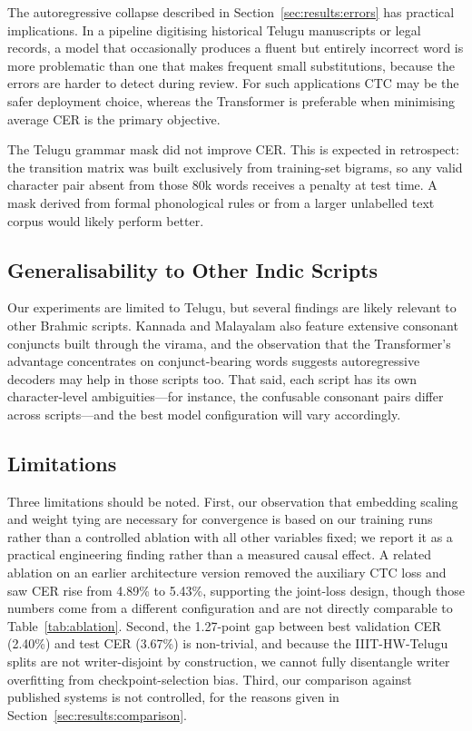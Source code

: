 \documentclass[pdflatex,sn-mathphys-num]{sn-jnl}
\begin{document}
The autoregressive collapse described in Section~\ref{sec:results:errors} has practical implications. In a pipeline digitising historical Telugu manuscripts or legal records, a model that occasionally produces a fluent but entirely incorrect word is more problematic than one that makes frequent small substitutions, because the errors are harder to detect during review. For such applications CTC may be the safer deployment choice, whereas the Transformer is preferable when minimising average CER is the primary objective.

The Telugu grammar mask did not improve CER. This is expected in retrospect: the transition matrix was built exclusively from training-set bigrams, so any valid character pair absent from those 80k words receives a penalty at test time. A mask derived from formal phonological rules or from a larger unlabelled text corpus would likely perform better.

\subsection{Generalisability to Other Indic Scripts}\label{sec:discussion:general}

Our experiments are limited to Telugu, but several findings are likely relevant to other Brahmic scripts. Kannada and Malayalam also feature extensive consonant conjuncts built through the virama, and the observation that the Transformer's advantage concentrates on conjunct-bearing words suggests autoregressive decoders may help in those scripts too. That said, each script has its own character-level ambiguities---for instance, the confusable consonant pairs differ across scripts---and the best model configuration will vary accordingly.

\subsection{Limitations}\label{sec:discussion:limitations}

Three limitations should be noted. First, our observation that embedding scaling and weight tying are necessary for convergence is based on our training runs rather than a controlled ablation with all other variables fixed; we report it as a practical engineering finding rather than a measured causal effect. A related ablation on an earlier architecture version removed the auxiliary CTC loss and saw CER rise from 4.89\% to 5.43\%, supporting the joint-loss design, though those numbers come from a different configuration and are not directly comparable to Table~\ref{tab:ablation}. Second, the 1.27-point gap between best validation CER (2.40\%) and test CER (3.67\%) is non-trivial, and because the IIIT-HW-Telugu splits are not writer-disjoint by construction, we cannot fully disentangle writer overfitting from checkpoint-selection bias. Third, our comparison against published systems is not controlled, for the reasons given in Section~\ref{sec:results:comparison}.
\end{document}
